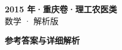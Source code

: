 \documentclass[zihao=-4, a4paper]{ctexart}
\begin{document}
\begin{center}
  {\Large\bfseries 2015 年·重庆卷·理工农医类}\\[4pt]
  {\large 数学 · 解析版}
\end{center}
\medskip
{}

\clearpage
{}
\begin{center}{\Large\bfseries 参考答案与详细解析}\end{center}
\medskip

\end{document}
